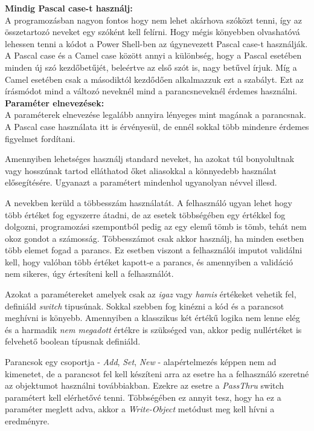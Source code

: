\documentclass[12pt,oneside,justify,table]{book}
\begin{document}
\noindent \textbf{Mindig Pascal case-t használj:} \\
A programozásban nagyon fontos hogy nem lehet akárhova szóközt tenni, így az összetartozó neveket egy szóként kell felírni. Hogy mégis könyebben olvashatóvá lehessen tenni a kódot a Power Shell-ben az úgynevezett Pascal case-t használják. A Pascal case és a Camel case között annyi a különbség, hogy a Pascal esetében minden új szó kezdőbetűjét, beleértve az első szót is, nagy betűvel írjuk. Míg a Camel esetében csak a másodiktól kezdődően alkalmazzuk ezt a szabályt. Ezt az írásmódot mind a változó neveknél mind a parancsneveknél érdemes használni. \\

\noindent \textbf{Paraméter elnevezések:} \\
A paraméterek elnevezése legalább annyira lényeges mint magának a parancsnak. A Pascal case használata itt is érvényesül, de ennél sokkal több mindenre érdemes figyelmet fordítani.

Amennyiben lehetséges használj standard neveket, ha azokat túl bonyolultnak vagy hosszúnak tartod elláthatod őket aliasokkal a könnyedebb használat elősegítésére. Ugyanazt a paramétert mindenhol ugyanolyan névvel illesd.

A nevekben kerüld a többesszám használatát. A felhasználó ugyan lehet hogy több értéket fog egyszerre átadni, de az esetek többségében egy értékkel fog dolgozni, programozási szempontból pedig az egy elemű tömb is tömb, tehát nem okoz gondot a számosság. Többesszámot csak akkor használj, ha minden esetben több elemet fogad a parancs. Ez esetben viszont a felhasználói imputot validálni kell, hogy valóban több értéket kapott-e a parancs, és amennyiben a validáció nem sikeres, úgy értesíteni kell a felhasználót.

Azokat a paramétereket amelyek csak az \textit{igaz} vagy \textit{hamis} értékeket vehetik fel, definiáld \textit{switch} tipusúnak. Sokkal szebben fog kinézni a kód és a parancsot meghívni is könyebb. Amennyiben a klasszikus két értékű logika nem lenne elég és a harmadik \textit{nem megadott} értékre is szükséged van, akkor pedig nullértéket is felvehető boolean típusnak definiáld. 

Parancsok egy csoportja - \textit{Add}, \textit{Set}, \textit{New} - alapértelmezés képpen nem ad kimenetet, de a parancsot fel kell készíteni arra az esetre ha a felhasználó szeretné az objektumot használni továbbiakban. Ezekre az esetre a \textit{PassThru} switch paramétert kell elérhetővé tenni. Többségében ez annyit tesz, hogy ha ez a paraméter meglett adva, akkor a \textit{Write-Object} metódust meg kell hívni a eredményre. \\
\end{document}
